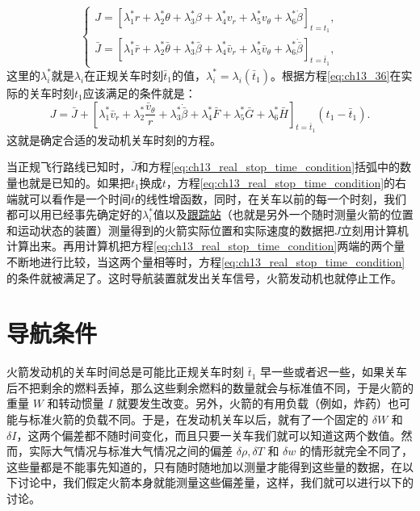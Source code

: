 \begin{equation}\label{eq:ch13_j_and_bar_j}
\begin{cases}
J = [\lambda_1^* r + \lambda_2^* \theta + \lambda_3^* \beta + \lambda_4^* v_r + \lambda_5^* v_\theta + \lambda_6^* \dot{\beta}]_{t=t_1},\\
\bar{J} = [\lambda_1^* \bar{r} + \lambda_2^* \bar{\theta} + \lambda_3^* \bar{\beta} + \lambda_4^* \bar{v}_r + \lambda_5^* \bar{v}_\theta + \lambda_6^* \dot{\bar{\beta}}]_{t=\bar{t}_1},
\end{cases}
\end{equation}
这里的$\lambda_i^*$就是$\lambda_i$在正规关车时刻$\bar{t}_1$的值，\(\lambda_i^* = \lambda_i(\bar{t}_1)\)。根据方程\eqref{eq:ch13_36}在实际的关车时刻$t_1$应该满足的条件就是：
\begin{equation}\label{eq:ch13_real_stop_time_condition}
J = \bar{J} + \left[ \lambda_1^* \bar{v}_r + \lambda_2^* \frac{\bar{v}_\theta}{r} + \lambda_3^* \dot{\bar{\beta}} + \lambda_4^* \bar{F} + \lambda_5^* \bar{G} + \lambda_6^* \bar{H} \right]_{t=\bar{t}_1} (t_1 - \bar{t}_1).
\end{equation}
这就是确定合适的发动机关车时刻的方程。

当正规飞行路线已知时，$\bar{J}$和方程\eqref{eq:ch13_real_stop_time_condition}括弧中的数量也就是已知的。如果把$t_1$换成$t$，方程\eqref{eq:ch13_real_stop_time_condition}的右端就可以看作是一个时间$t$的线性增函数，同时，在关车以前的每一个时刻，我们都可以用已经事先确定好的$\lambda_i^*$值以及\underline{跟踪站}（也就是另外一个随时测量火箭的位置和运动状态的装置）测量得到的火箭实际位置和实际速度的数据把$J$立刻用计算机计算出来。再用计算机把方程\eqref{eq:ch13_real_stop_time_condition}两端的两个量不断地进行比较，当这两个量相等时，方程\eqref{eq:ch13_real_stop_time_condition}的条件就被满足了。这时导航装置就发出关车信号，火箭发动机也就停止工作。

\section{导航条件}

火箭发动机的关车时间总是可能比正规关车时刻 $\bar{t}_1$ 早一些或者迟一些，如果关车后不把剩余的燃料丢掉，那么这些剩余燃料的数量就会与标准值不同，于是火箭的重量 $W$ 和转动惯量 $I$ 就要发生改变。另外，火箭的有用负载（例如，炸药）也可能与标准火箭的负载不同。于是，在发动机关车以后，就有了一个固定的 $\delta W$ 和 $\delta I$，这两个偏差都不随时间变化，而且只要一关车我们就可以知道这两个数值。然而，实际大气情况与标准大气情况之间的偏差 $\delta \rho, \delta T$ 和 $\delta w$ 的情形就完全不同了，这些量都是不能事先知道的，只有随时随地加以测量才能得到这些量的数据，在以下讨论中，我们假定火箭本身就能测量这些偏差量，这样，我们就可以进行以下的讨论。

